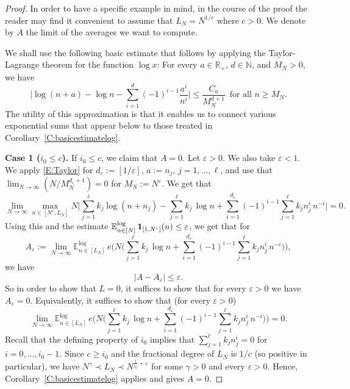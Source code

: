 \documentclass[11pt]{amsart}
\theoremstyle{definition}
\newcommand{\lE}{\mathbb{E}^{\log}}
\newcommand{\N}{{\mathbb N}}
\newcommand{\R}{{\mathbb R}}
\begin{document}
 \begin{proof}
 	In order to have a specific example in mind, in the course of the proof the reader may find it convenient to assume that $L_N=N^{1/c}$ where $c>0$. We denote by $A$ the limit of the averages we want to compute.
 	
 	
	We shall use the following basic estimate that follows by applying the Taylor-Lagrange theorem for   the function
	$\log{x}$: For every $a\in \R_+$,  $d\in \N$, and $M_N >0$,  we have
	\begin{equation}\label{E:Taylor}
		\Big| \log(n+a)-\log n- \sum_{i=1}^d (-1)^{i-1} \frac{a^i} {n^i}\Big|\leq \frac{C_a}{M_N^{d+1}}\,  \text{ for all } n\geq  M_N.
	\end{equation}
	The utility of this approximation is that it  enables us to connect various exponential sums that appear below to those treated in Corollary~\ref{C:basicestimatelog}.
	\medskip
	
	{\bf Case 1 ($i_0\leq c$).}	If   $i_0\leq c$, we claim that   $A=0$.
	Let $\varepsilon>0$. We also take $\varepsilon<1$.
	We apply \eqref{E:Taylor}  for $d_\varepsilon:=[1/\varepsilon]$,   $a:=n_j$, $j=1,\ldots, \ell$,  and use that
	$\lim_{N\to\infty} (N / M_N^{d_\varepsilon+1})= 0$ for $M_N:=N^{\varepsilon}$. We get that
	$$
	\lim_{N\to \infty} \max_{n\in [N^{\varepsilon},L_N]}  N\Big| \sum_{j=1}^\ell k_j \log(n+n_j)- \sum_{j=1}^\ell k_j\, \log{n}+ \sum_{i=1}^{d_\varepsilon} (-1)^{i-1} \sum_{j=1}^\ell k_j n_j^i\,  n^{-i}\Big|=0.
	$$
	Using this and the estimate  $ \lE_{n\in[N]}\, {\bf 1}_{[1,N^\varepsilon]} (n)\leq \varepsilon$, we get that for
	$$
	A_{\varepsilon}:=	\lim_{N\to\infty} \lE_{n\in[L_N]}\,  e\big(N\big( \sum_{j=1}^\ell k_j\, \log{n}+ \sum_{i=1}^{d_\varepsilon} (-1)^{i-1} \sum_{j=1}^\ell k_j n_j^i\,  n^{-i}\big)\big),
	$$	
	we have
	$$
	|A-A_{\varepsilon}|\leq \varepsilon.
	$$
	So in order to show that $L=0$, it suffices to show that for every $\varepsilon>0$ we have $A_{\varepsilon}=0$.
	Equivalently, it suffices to show that (for every $\varepsilon>0$)
	$$
	\lim_{N\to\infty} \lE_{n\in[L_N]} \,  e\big(N\big( \sum_{j=1}^\ell k_j\, \log{n}+ \sum_{i=1}^{d_\varepsilon} (-1)^{i-1} \sum_{j=1}^\ell k_j n_j^i\,  n^{-i}\big)\big)=0.
	$$	
	Recall that the defining property of $i_0$ implies that
	$\sum_{j=1}^\ell k_j n_j^i=0$  for $i=0,\ldots,i_0-1$. Since $c\geq i_0$  and the fractional degree of $L_N$ is $1/c$ (so positive in particular), we have  $N^\gamma\prec L_N\prec N^{\frac{1}{i_0}+\varepsilon}$ for some $\gamma>0$ and every $\varepsilon>0$.  Hence, Corollary~\ref{C:basicestimatelog} applies and gives  $A=0$.
	

\end{proof}
\end{document}
